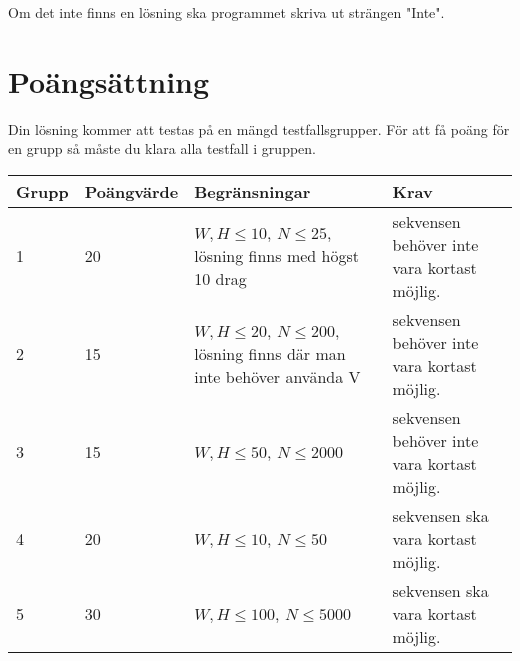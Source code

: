 Om det inte finns en lösning ska programmet skriva ut strängen "Inte".

\section*{Poängsättning}
Din lösning kommer att testas på en mängd testfallsgrupper. För att få poäng för en grupp så måste du klara alla testfall i gruppen.

\begin{tabular}{| l | l | l | l |}
	\hline
	Grupp & Poängvärde & Begränsningar & Krav \\ \hline
  1     & 20  & $W,H \le 10$, $N \le 25$, lösning finns med högst 10 drag & sekvensen behöver inte vara kortast möjlig. \\ \hline
  2     & 15  & $W,H \le 20$, $N \le 200$, lösning finns där man inte behöver använda V & sekvensen behöver inte vara kortast möjlig. \\ \hline
  3     & 15  & $W,H \le 50$, $N \le 2000$ & sekvensen behöver inte vara kortast möjlig. \\ \hline
  4     & 20  & $W,H \le 10$, $N \le 50$ & sekvensen ska vara kortast möjlig. \\ \hline
  5     & 30  & $W,H \le 100$, $N \le 5000$ & sekvensen ska vara kortast möjlig. \\ \hline
\end{tabular}
